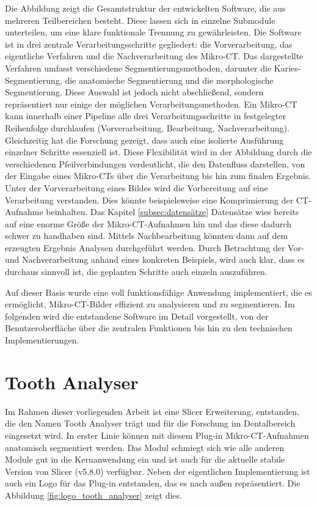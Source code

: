 Die Abbildung zeigt die Gesamtstruktur der entwickelten Software, die aus mehreren
Teilbereichen besteht. Diese lassen sich in einzelne Submodule unterteilen, um eine
klare funktionale Trennung zu gewährleisten. Die Software ist in drei zentrale
Verarbeitungsschritte gegliedert: die Vorverarbeitung, das eigentliche Verfahren
und die Nachverarbeitung des Mikro-CT. Das dargestellte Verfahren umfasst verschiedene
Segmentierungsmethoden, darunter die Karies-Segmentierung, die anatomische Segmentierung
und die morphologische Segmentierung. Diese Auswahl ist jedoch nicht
abschließend, sondern repräsentiert nur einige der möglichen Verarbeitungsmethoden.
Ein Mikro-CT kann innerhalb einer Pipeline alle drei Verarbeitungsschritte in
festgelegter Reihenfolge durchlaufen (Vorverarbeitung, Bearbeitung, Nachverarbeitung).
Gleichzeitig hat die Forschung gezeigt, dass auch eine isolierte Ausführung
einzelner Schritte essenziell ist. Diese Flexibilität wird in der Abbildung durch
die verschiedenen Pfeilverbindungen verdeutlicht, die den Datenfluss darstellen,
von der Eingabe eines Mikro-CTs über die Verarbeitung bis hin zum finalen Ergebnis.
Unter der Vorverarbeitung eines Bildes wird die Vorbereitung auf eine
Verarbeitung verstanden. Dies könnte beispielsweise eine Komprimierung der CT-Aufnahme
beinhalten. Das Kapitel \ref{subsec:datensätze} Datensätze wies bereits auf eine
enorme Größe der Mikro-CT-Aufnahmen hin und das diese dadurch schwer zu
handhaben sind. Mittels Nachbearbeitung könnten dann auf dem erzeugten Ergebnis Analysen
durchgeführt werden. Durch Betrachtung der Vor- und Nachverarbeitung anhand eines
konkreten Beispiels, wird auch klar, dass es durchaus sinnvoll ist, die
geplanten Schritte auch einzeln auszuführen.

Auf dieser Basis wurde eine voll funktionsfähige Anwendung implementiert, die es
ermöglicht, Mikro-CT-Bilder effizient zu analysieren und zu segmentieren. Im folgenden
wird die entstandene Software im Detail vorgestellt, von der Benutzeroberfläche
über die zentralen Funktionen bis hin zu den technischen Implementierungen.

\pagebreak

\section{Tooth Analyser}
\label{sec:tooth_analyser} Im Rahmen dieser vorliegenden Arbeit ist eine Slicer Erweiterung,
entstanden, die den Namen Tooth Analyser trägt und für die Forschung im Dentalbereich
eingesetzt wird. In erster Linie können mit diesem Plug-in Mikro-\ac{CT}-Aufnahmen
anatomisch segmentiert werden. Das Modul schmiegt sich wie alle anderen Module
gut in die Kernanwendung ein und ist auch für die aktuelle stabile Version von
Slicer (v5.8.0) verfügbar. Neben der eigentlichen Implementierung ist auch ein Logo
für das Plug-in entstanden, das es nach außen repräsentiert. Die Abbildung \ref{fig:logo_tooth_analyser}
zeigt dies.

